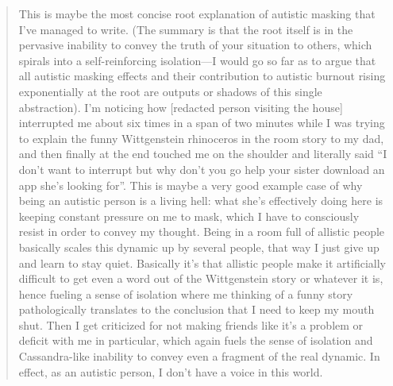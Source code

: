 \begin{quote}
This is maybe the most concise root explanation of autistic masking that I’ve managed to write. (The summary is that the root itself is in the pervasive inability to convey the truth of your situation to others, which spirals into a self-reinforcing isolation—I would go so far as to argue that all autistic masking effects and their contribution to autistic burnout rising exponentially at the root are outputs or shadows of this single abstraction).  I’m noticing how [redacted person visiting the house] interrupted me about six times in a span of two minutes while I was trying to explain the funny Wittgenstein rhinoceros in the room story to my dad, and then finally at the end touched me on the shoulder and literally said “I don’t want to interrupt but why don’t you go help your sister download an app she’s looking for”. This is maybe a very good example case of why being an autistic person is a living hell: what she’s effectively doing here is keeping constant pressure on me to mask, which I have to consciously resist in order to convey my thought. Being in a room full of allistic people basically scales this dynamic up by several people, that way I just give up and learn to stay quiet. Basically it’s that allistic people make it artificially difficult to get even a word out of the Wittgenstein story or whatever it is, hence fueling a sense of isolation where me thinking of a funny story pathologically translates to the conclusion that I need to keep my mouth shut. Then I get criticized for not making friends like it’s a problem or deficit with me in particular, which again fuels the sense of isolation and Cassandra-like inability to convey even a fragment of the real dynamic. In effect, as an autistic person, I don’t have a voice in this world.
\end{quote}

